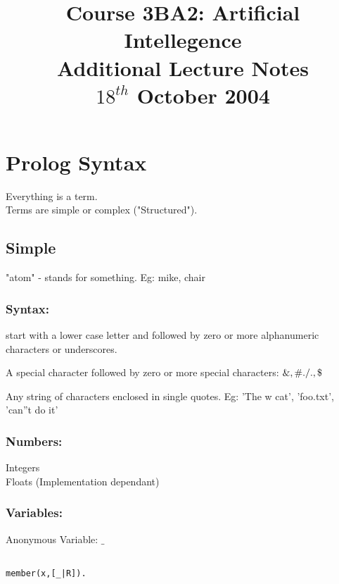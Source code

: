 \documentclass[a4paper,12pt]{article}
\begin{document}
\title{Course 3BA2: Artificial Intellegence \\ Additional Lecture Notes \\ $18^{th}$ October 2004}

\maketitle

\section*{Prolog Syntax}

Everything is a term. \\

Terms are simple or complex ("Structured").

\subsection*{Simple}

"atom" - stands for something. Eg: mike, chair \\

\subsubsection*{Syntax:} 

start with a lower case letter and followed by zero or more 
alphanumeric characters or underscores.


A special character followed by zero or more special characters: $ \&, \#. /. \*, \$ $


Any string of characters enclosed in single quotes. Eg: 'The w
cat', 'foo.txt', 'can''t do it'

\subsubsection*{Numbers:}

Integers \\

Floats (Implementation dependant)

\subsubsection{Variables:}

Anonymous Variable: $\_$ \\


\begin{verbatim}

member(x,[_|R]).

\end{verbatim}
\end{document}
